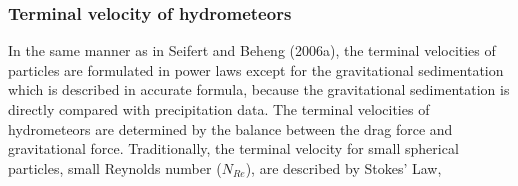 \begin{table}[h]
\begin{center}
\caption{Constant parameters chosen for the generalized gamma distribution; power law coefficients used for maximum dimensions and the projected area; and ranges of lower- and upper limits of mean mass.}
\label{table_sn13-1}
\end{center}
\end{table}

\subsubsection{Terminal velocity of hydrometeors}
In the same manner as in Seifert and Beheng (2006a), the terminal velocities of particles are formulated in power laws except for the gravitational sedimentation which is described in accurate formula, because the gravitational sedimentation is directly compared with precipitation data. The terminal velocities of hydrometeors are determined by the balance between the drag force and gravitational force. Traditionally, the terminal velocity for small spherical particles, small Reynolds number ($N_{Re}$), are described by Stokes’ Law,

